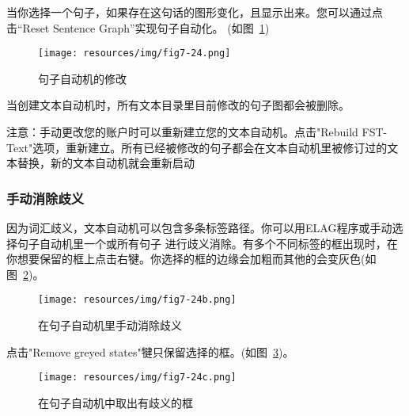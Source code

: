 \bigskip
\noindent 
当你选择一个句子，如果存在这句话的图形变化，且显示出来。您可以通过点击“Reset Sentence Graph”实现句子自动化。 (如图~\ref{fig-modified-sentence-automaton})

\begin{figure}[!ht]
\begin{center}
\texttt{[image: resources/img/fig7-24.png]}
\caption{句子自动机的修改\label{fig-modified-sentence-automaton}}
\end{center}
\end{figure}

\bigskip
\noindent
当创建文本自动机时，所有文本目录里目前修改的句子图都会被删除。

\bigskip
\noindent
注意：手动更改您的账户时可以重新建立您的文本自动机。点击"Rebuild FST-Text"选项，重新建立。所有已经被修改的句子都会在文本自动机里被修订过的文本替换，新的文本自动机就会重新启动


\subsubsection{手动消除歧义}
因为词汇歧义，文本自动机可以包含多条标签路径。你可以用ELAG程序或手动选择句子自动机里一个或所有句子
进行歧义消除。有多个不同标签的框出现时，在你想要保留的框上点击右犍。你选择的框的边缘会加粗而其他的会变灰色(如图~\ref{fig-manually-resolve-ambiguities})。


\begin{figure}[!ht]
\begin{center}
\texttt{[image: resources/img/fig7-24b.png]}
\caption{在句子自动机里手动消除歧义\label{fig-manually-resolve-ambiguities}}
\end{center}
\end{figure} 

\bigskip
\noindent
点击"Remove greyed states"犍只保留选择的框。(如图~\ref{fig-removed-ambiguities})。


\begin{figure}[!ht]
\begin{center}
\texttt{[image: resources/img/fig7-24c.png]}
\caption{在句子自动机中取出有歧义的框
\label{fig-removed-ambiguities}}
\end{center}
\end{figure}

\bigskip
\noindent


